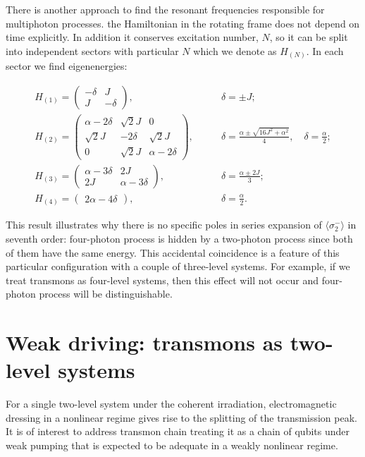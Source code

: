 \documentclass[%
 aps, pra,
 amsmath,amssymb,
 preprint,%
superscriptaddress
]{revtex4-2}
\begin{document}
There is another approach to find the resonant frequencies responsible for multiphoton processes. 
the Hamiltonian in the rotating frame does not depend on time explicitly. In addition it conserves excitation number, $N$, so it can be split into independent sectors with particular $N$ which we denote as $H_{(N)}$.
In each sector we find eigenenergies:
\begin{widetext}
$$
\begin{array}{ccc}
H_{(1)} = \begin{pmatrix}
-\delta & J
\\
J & -\delta
\end{pmatrix},
\qquad &
\delta = \pm J;
\\[1em]
H_{(2)} = \begin{pmatrix}
\alpha - 2\delta & \sqrt{2} J & 0
\\
\sqrt{2} J & - 2\delta & \sqrt{2} J
\\
0 & \sqrt{2} J & \alpha - 2 \delta
\end{pmatrix},
\qquad &
\displaystyle
\delta = \frac{\alpha \pm \sqrt{16 J^2 + \alpha^2}}{4}, \quad \delta = \frac{\alpha}{2};
\\[2em]
H_{(3)} = \begin{pmatrix}
\alpha - 3\delta & 2J
\\
2 J & \alpha - 3 \delta
\end{pmatrix},
\qquad & \displaystyle
\delta = \frac{\alpha \pm 2 J}{3};
\\[2em]
H_{(4)} = \begin{pmatrix}
2 \alpha - 4\delta
\end{pmatrix},
\qquad & \displaystyle
\delta = \frac{\alpha}{2}.
\end{array}
$$
\end{widetext}
This result illustrates why there is no specific poles in series expansion of $\langle\sigma_{2}^-\rangle$ in seventh order: four-photon process is hidden by a two-photon process since both of them have the same energy. This accidental coincidence is a feature of this particular configuration with a couple of three-level systems. For example, if we treat transmons as  four-level systems, then this effect will not occur and four-photon process will be distinguishable.

\section{Weak driving: transmons as two-level systems}

For a single two-level system under the coherent irradiation, electromagnetic dressing in a nonlinear regime gives rise to the splitting of the transmission peak. It is of interest to address transmon chain treating it as a chain of qubits under weak pumping that is expected to be adequate in a weakly nonlinear regime.
\end{document}
